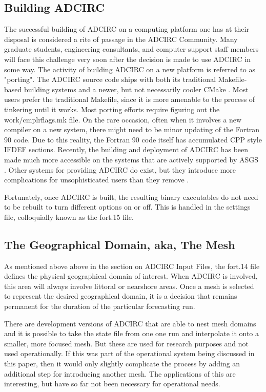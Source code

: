 \documentclass{article}
\begin{document}
\subsection{Building ADCIRC}

The successful building of ADCIRC on a computing platform one has at their
disposal is considered a rite of passage in the ADCIRC Community. Many graduate
students, engineering consultants, and computer support staff members will face
this challenge very soon after the decision is made to use ADCIRC in some way.
The activity of building ADCIRC on a new platform is referred to as "porting".
The ADCIRC source code ships with both its traditional Makefile-based \cite{}
building systems and a newer, but not necessarily cooler CMake \cite{}. Most
users prefer the traditional Makefile, since it is more amenable to the process
of tinkering until it works. Most porting efforts require figuring out the
work/cmplrflags.mk file. On the rare occasion, often when it involves a new
compiler on a new system, there might need to be minor updating of the Fortran
90 code. Due to this reality, the Fortran 90 code itself has accumulated CPP
style IFDEF sections.  Recently, the building and deployment of ADCIRC has been
made much more accessible on the systems that are actively supported by ASGS
\cite{}. Other systems for providing ADCIRC do exist, but they introduce
more complications for unsophisticated users than they remove \cite{}.

Fortunately, once ADCIRC is built, the resulting binary executables do not need
to be rebuilt to turn different options on or off. This is handled in the
settings file, colloquially known as the fort.15 file.

\subsection{The Geographical Domain, aka, The Mesh}

As mentioned above above in the section on ADCIRC Input Files, the fort.14 file
defines the physical geographical domain of interest. When ADCIRC is involved,
this area will always involve littoral or nearshore areas. Once a mesh is
selected to represent the desired geographical domain, it is a decision that
remains permanent for the duration of the particular forecasting run.

There are development versions of ADCIRC that are able to nest mesh domains and
it is possible to take the state file from one one run and interpolate it onto a
smaller, more focused mesh. But these are used for research purposes and not
used operationally. If this was part of the operational system being discussed
in this paper, then it would only slightly complicate the process by adding an
additional step for introducing another mesh. The applications of this are
interesting, but have so far not been necessary for operational needs.
\end{document}
